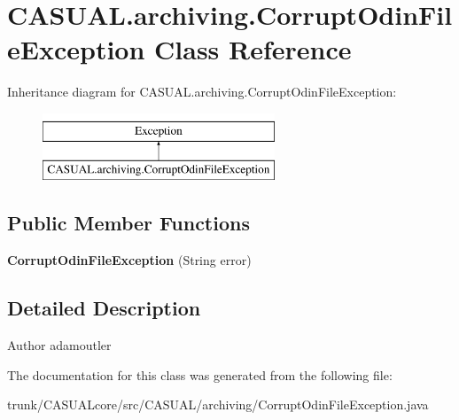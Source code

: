 \hypertarget{classCASUAL_1_1archiving_1_1CorruptOdinFileException}{\section{C\-A\-S\-U\-A\-L.\-archiving.\-Corrupt\-Odin\-File\-Exception Class Reference}
\label{classCASUAL_1_1archiving_1_1CorruptOdinFileException}
}
Inheritance diagram for C\-A\-S\-U\-A\-L.\-archiving.\-Corrupt\-Odin\-File\-Exception\-:\begin{figure}[H]
\begin{center}
\leavevmode
\includegraphics[height=2.000000cm]{classCASUAL_1_1archiving_1_1CorruptOdinFileException}
\end{center}
\end{figure}
\subsection*{Public Member Functions}
\begin{DoxyCompactItemize}
\item 
\hypertarget{classCASUAL_1_1archiving_1_1CorruptOdinFileException_af0eb2e388f2705ab50b2e8371eea1f53}{{\bfseries Corrupt\-Odin\-File\-Exception} (String error)}\label{classCASUAL_1_1archiving_1_1CorruptOdinFileException_af0eb2e388f2705ab50b2e8371eea1f53}

\end{DoxyCompactItemize}


\subsection{Detailed Description}
\begin{DoxyAuthor}{Author}
adamoutler 
\end{DoxyAuthor}


The documentation for this class was generated from the following file\-:\begin{DoxyCompactItemize}
\item 
trunk/\-C\-A\-S\-U\-A\-Lcore/src/\-C\-A\-S\-U\-A\-L/archiving/Corrupt\-Odin\-File\-Exception.\-java\end{DoxyCompactItemize}
